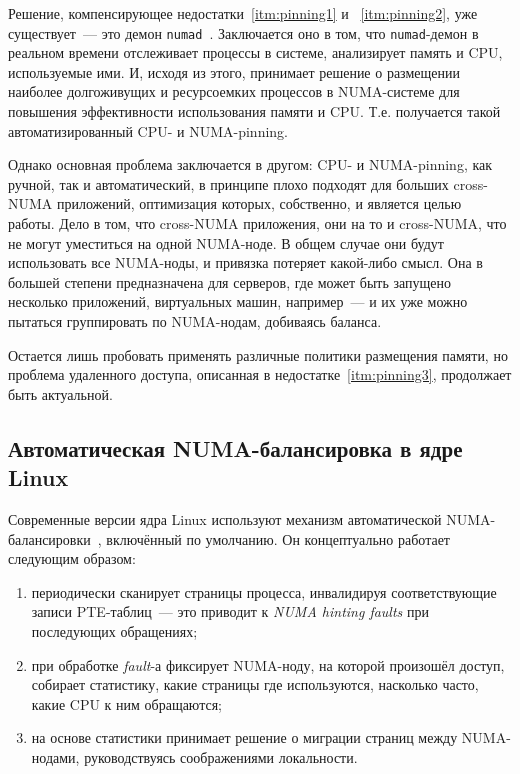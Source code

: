 Решение, компенсирующее недостатки~\ref{itm:pinning1} и ~\ref{itm:pinning2}, уже существует~--- это демон \texttt{numad}~\cite{numad}. Заключается оно в том, что \texttt{numad}-демон в реальном времени отслеживает процессы в системе, анализирует память и CPU, используемые ими. И, исходя из этого, принимает решение о размещении наиболее долгоживущих и ресурсоемких процессов в NUMA-системе для повышения эффективности использования памяти и CPU. Т.е. получается такой автоматизированный CPU- и NUMA-pinning.

Однако основная проблема заключается в другом: CPU- и NUMA-pinning, как ручной, так и автоматический, в принципе плохо подходят для больших cross-NUMA приложений, оптимизация которых, собственно, и является целью работы. Дело в том, что cross-NUMA приложения, они на то и cross-NUMA, что не могут уместиться на одной NUMA-ноде. В общем случае они будут использовать все NUMA-ноды, и привязка потеряет какой-либо смысл. Она в большей степени предназначена для серверов, где может быть запущено несколько приложений, виртуальных машин, например~--- и их уже можно пытаться группировать по NUMA-нодам, добиваясь баланса.

Остается лишь пробовать применять различные политики размещения памяти, но проблема удаленного доступа, описанная в недостатке~\ref{itm:pinning3}, продолжает быть актуальной.

\subsection{Автоматическая NUMA-балансировка в ядре Linux}
\label{sec:Chapter2_NUMA_balancer}

Современные версии ядра Linux используют механизм автоматической NUMA-балансировки~\cite{numa_balancing_lwn, numa_balancing_doc}, включённый по умолчанию. Он концептуально работает следующим образом:
\begin{enumerate}
    \item периодически сканирует страницы процесса, инвалидируя соответствующие записи PTE-таблиц~--- это приводит к \textit{NUMA hinting faults} при последующих обращениях;
    \item при обработке \textit{fault}-а фиксирует NUMA-ноду, на которой произошёл доступ, собирает статистику, какие страницы где используются, насколько часто, какие CPU к ним обращаются;
    \item на основе статистики принимает решение о миграции страниц между NUMA-нодами, руководствуясь соображениями локальности.
\end{enumerate}

